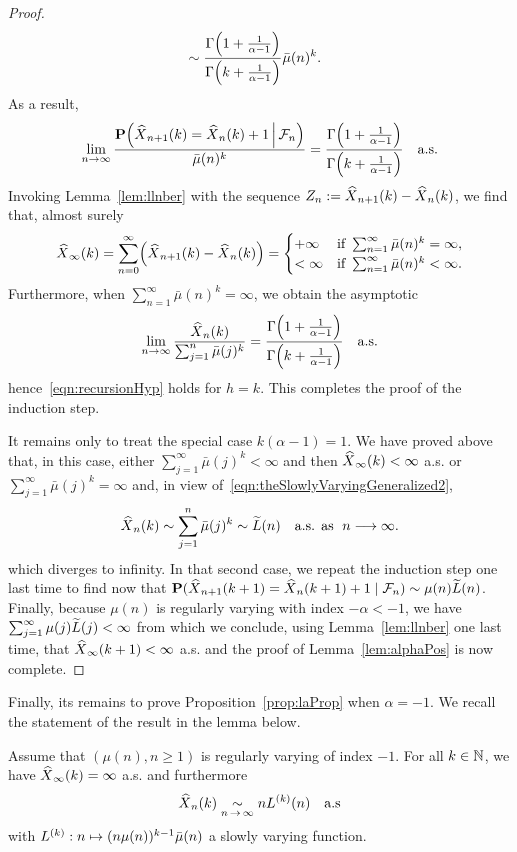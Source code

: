 \documentclass[AHL,Unicode,longabstracts,published]{cedram}
\newcommand{\bbN}{\mathbb{N}}
\renewcommand{\P}{\mathbf{P}}
\newcommand{\clF}{\mathcal{F}}
\let\originalleft\left
\let\originalright\right
\renewcommand{\left}{\mathopen{}\mathclose\bgroup\originalleft}
\renewcommand{\right}{\aftergroup\egroup\originalright}
\let\oldin\in
\renewcommand{\in}{\mathchoice{\oldin}{\oldin}{\,\oldin\,}{\,\oldin\,}}
\renewcommand*{\to}{\mathchoice{\longrightarrow}{\rightarrow}{\rightarrow}{\rightarrow}}
\let\oldmapsto\mapsto
\renewcommand*{\mapsto}{\mathchoice{\longmapsto}{\oldmapsto}{\oldmapsto}{\oldmapsto}}
\let\oldtilde\tilde
\renewcommand*{\tilde}[1]{\mathchoice{\widetilde{#1}}{\widetilde{#1}}{\oldtilde{#1}}{\oldtilde{#1}}}
\let\oldhat\hat
\renewcommand*{\hat}[1]{\mathchoice{\widehat{#1}}{\widehat{#1}}{\oldhat{#1}}{\oldhat{#1}}}
\begin{document}
\begin{proof}
\begin{align*}
&\sim \frac{\Gamma\left(1 + \frac{1}{\alpha - 1}\right)}{\Gamma\left(k + \frac{1}{\alpha - 1}\right)} \bar{\mu}(n)^k.
\end{align*}
As a result,
\begin{equation*}
\lim_{n \to \infty} \frac{\P\left(\hat{X}_{n+1}(k) = \hat{X}_n(k) + 1\,\middle|\, \clF_n\right)}{\bar{\mu}(n)^k} = \frac{\Gamma\left(1 + \frac{1}{\alpha - 1}\right)}{\Gamma\left(k + \frac{1}{\alpha - 1}\right)} \quad \text{a.s.}
\end{equation*}
Invoking Lemma~\ref{lem:llnber} with the sequence $Z_n
:= \hat{X}_{n+1}(k) - \hat{X}_n(k)$, we find that, almost surely
\[
\hat{X}_\infty(k) = \sum_{n=0}^{\infty} \left(\hat{X}_{n+1}(k) - \hat{X}_n(k)\right) =
\begin{cases}
+ \infty & \text{if }\sum_{n=1}^\infty \bar{\mu}(n)^k = \infty,\\
< \infty & \text{if }\sum_{n=1}^\infty \bar{\mu}(n)^k < \infty.
\end{cases}
\]
Furthermore, when $\sum_{n=1}^\infty \bar{\mu}(n)^k = \infty$, we obtain the asymptotic
\[
\lim_{n \to \infty} \frac{\hat{X}_n(k)}{\sum_{j=1}^n \bar{\mu}(j)^k} = \frac{\Gamma\left(1 + \frac{1}{\alpha - 1}\right)}{\Gamma\left(k + \frac{1}{\alpha - 1}\right)} \quad \text{a.s.}
\]
hence~\eqref{eqn:recursionHyp} holds for $h=k$. This completes the proof of the induction step.

It remains only to treat the special case $k(\alpha -1) = 1$. We have proved above that, in this case, either $\sum_{j=1}^\infty \bar{\mu}(j)^k < \infty$ and then $\hat{X}_\infty(k) < \infty$ a.s. or $\sum_{j=1}^\infty \bar{\mu}(j)^k = \infty$ and, in view of~\eqref{eqn:theSlowlyVaryingGeneralized2},
\[
\hat{X}_n(k) \sim \sum_{j=1}^n \bar{\mu}(j)^k \sim \tilde{L}(n) \quad \text{a.s. as }\; n\to\infty.
\]
which diverges to infinity. In that second case, we repeat the induction step one last time to find now that $\P(\hat{X}_{n+1}(k+1) = \hat{X}_n(k+1) + 1\mid\clF_n) \sim \mu(n)\tilde{L}(n)$. Finally, because $\mu(n)$ is regularly varying with index $-\alpha < -1$, we have $\sum_{j=1}^\infty \mu(j)\tilde{L}(j) < \infty$ from which we conclude, using Lemma~\ref{lem:llnber} one last time, that $\hat{X}_\infty(k+1) < \infty$ a.s. and the proof of Lemma~\ref{lem:alphaPos} is now complete.
\end{proof}

Finally, its remains to prove Proposition~\ref{prop:laProp} when $\alpha = -1$. We recall the statement of the result in the lemma below.
\begin{lemm}\label{lem:alphaNul}
Assume that $(\mu(n), n \geq 1)$ is regularly varying of index $-1$. For all $k \in \bbN$, we have $\hat{X}_\infty(k) = \infty$ a.s. and furthermore
\[
\hat{X}_n(k) \underset{n\,\to\,\infty}{\sim} nL^{(k)}(n) \quad \text{a.s}
\]
with $L^{(k)} : n \mapsto (n \mu(n))^{k-1} \bar{\mu}(n)$ a slowly varying function.
\end{lemm}
\end{document}
